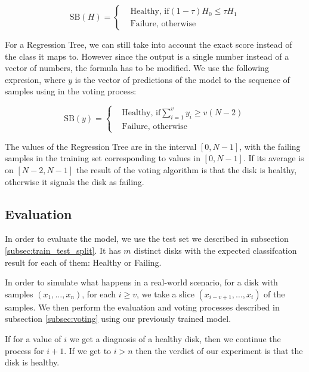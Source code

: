 \begin{equation}\label{eq:score_based_voting}
  \text{SB}(H) = 
    \begin{cases}
        & \text{Healthy, if} (1-\tau)H_0 \leq \tau H_1 \\
        & \text{Failure, otherwise} 
  \end{cases}
\end{equation}

For a Regression Tree, we can still take into account the exact score instead of the class it maps to.
However since the output is a single number instead of a vector of numbers, the formula has to be modified.
We use the following expresion, where $y$ is the vector of predictions of the model to the sequence of samples using in the voting process:

\begin{equation}\label{eq:score_based_voting_regression}
  \text{SB}(y) = 
    \begin{cases}
        & \text{Healthy, if} \sum_{i=1}^v y_i \geq v(N-2) \\
        & \text{Failure, otherwise} 
  \end{cases}
\end{equation}

The values of the Regression Tree are in the interval $[0,N-1]$, with the failing samples in the training set corresponding to values in $[0,N-1]$.
If its average is on $[N-2,N-1]$ the result of the voting algorithm is that the disk is healthy, otherwise it signals the disk as failing.

\subsection{Evaluation}

In order to evaluate the model, we use the test set we described in subsection \ref{subsec:train_test_split}.
It has $m$ distinct disks with the expected classifcation result for each of them: Healthy or Failing.

In order to simulate what happens in a real-world scenario, for a disk with samples $(x_1,\dots,x_n)$, for each $i \geq v$, we take a slice $(x_{i-v+1}, \dots, x_i)$ of the samples.
We then perform the evaluation and voting processes described in subsection \ref{subsec:voting} using our previously trained model.

If for a value of $i$ we get a diagnosis of a healthy disk, then we continue the process for $i+1$.
If we get to $i > n$ then the verdict of our experiment is that the disk is healthy.

